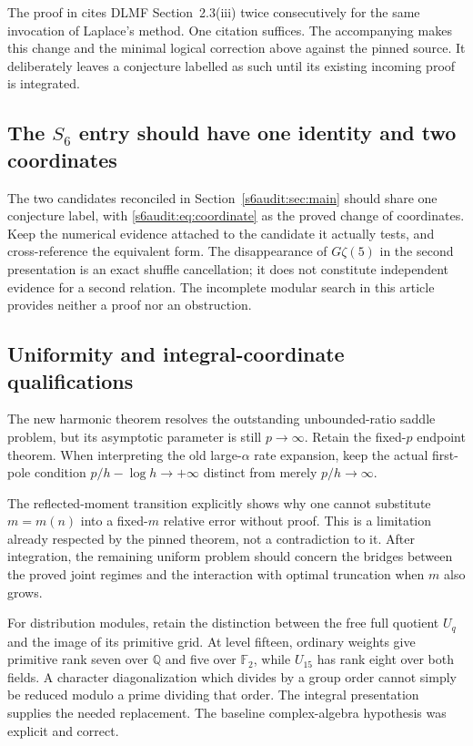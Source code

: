 The proof in  cites DLMF
Section~2.3(iii) twice consecutively for the same invocation of
Laplace's method. One citation suffices. The accompanying
 makes this change and the
minimal logical correction above against the pinned source.
It deliberately leaves a conjecture labelled as such until its
existing incoming proof is integrated.

\subsection[The S6 entry should have one identity and two coordinates]{The $S_6$ entry should have one identity and two coordinates}

The two candidates reconciled in Section~\ref{s6audit:sec:main}
should share one conjecture label, with
\eqref{s6audit:eq:coordinate} as the proved change of coordinates.
Keep the numerical evidence attached to the candidate it actually
tests, and cross-reference the equivalent form. The disappearance of
$G\zeta(5)$ in the second presentation is an exact shuffle
cancellation; it does not constitute independent evidence for a
second relation. The incomplete modular search in this article
provides neither a proof nor an obstruction.

\subsection{Uniformity and integral-coordinate qualifications}

The new harmonic theorem resolves the outstanding unbounded-ratio
saddle problem, but its asymptotic parameter is still $p\to\infty$.
Retain the fixed-$p$ endpoint theorem. When interpreting the old
large-$\alpha$ rate expansion, keep the actual first-pole condition
$p/h-\log h\to+\infty$ distinct from merely $p/h\to\infty$.

The reflected-moment transition explicitly shows why one cannot
substitute $m=m(n)$ into a fixed-$m$ relative error without proof.
This is a limitation already respected by the pinned theorem, not
a contradiction to it. After integration, the remaining uniform
problem should concern the bridges between the proved joint regimes
and the interaction with optimal truncation when $m$ also grows.

For distribution modules, retain the distinction between the free
full quotient $U_q$ and the image of its primitive grid. At level
fifteen, ordinary weights give primitive rank seven over
$\mathbb Q$ and five over $\mathbb F_2$, while $U_{15}$ has rank
eight over both fields. A character diagonalization which divides
by a group order cannot simply be reduced modulo a prime dividing
that order. The integral presentation supplies the needed replacement.
The baseline complex-algebra hypothesis was explicit and correct.

